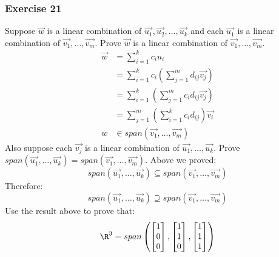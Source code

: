 \documentclass{math}
\begin{document}
\subsubsection*{Exercise 21}
Suppose \( \vec{w} \) is a linear combination of \( \vec{u_1},\vec{u_2},\dots,
\vec{u_k} \) and each \( \vec{u_1} \) is a linear combination of \( \vec{v_1},
\dots,\vec{v_m} \). Prove \( \vec{w} \) is a linear combination of \( \vec{v_1},
\dots,\vec{v_m} \).
\begin{align*}
  \vec{w} &= \sum_{i=1}^{k}c_iu_i \\
  &= \sum_{i=1}^{k}c_i\left(\sum_{j=1}^{m}d_{ij}\vec{v_j}\right) \\
  &= \sum_{i=1}^{k}\left(\sum_{j=1}^{m}c_id_{ij}\vec{v_j}\right) \\
  &= \sum_{j=1}^{m}\left(\sum_{i=1}^{k}c_id_{ij}\right)\vec{v_i} \\
  w &\in span(\vec{v_1},\dots,\vec{v_m})
\end{align*}
Also suppose each \( \vec{v_j} \) is a linear combination of \( \vec{u_1},\dots,
\vec{u_k} \). Prove \( span(\vec{u_1},\dots,\vec{u_k}) =
span(\vec{v_1},\dots,\vec{v_m}) \). Above we proved:
\[ span(\vec{u_1},\dots,\vec{u_k}) \subseteq span(\vec{v_1},\dots,\vec{v_m}) \]
Therefore:
\[ span(\vec{u_1},\dots,\vec{u_k}) \supseteq span(\vec{v_1},\dots,\vec{v_m}) \]
Use the result above to prove that:
\[ \R^3 = span\left(\begin{bmatrix}1 \\ 0 \\ 0\end{bmatrix},
  \begin{bmatrix}1 \\ 1 \\ 0\end{bmatrix},
  \begin{bmatrix}1 \\ 1 \\ 1\end{bmatrix}\right) \]
\end{document}
